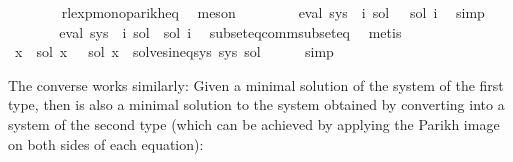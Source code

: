 \begin{isabellebody}
\ \ \ \ \ \ \isamarkupfalse%
\ rlexp{\isacharunderscore}{\kern0pt}mono{\isacharunderscore}{\kern0pt}parikh{\isacharunderscore}{\kern0pt}eq\ \isamarkupfalse%
\ meson\isanewline
\ \ \ \ \isamarkupfalse%
\ \isamarkupfalse%
\ {\isachardoublequoteopen}{\isasymPsi}\ {\isacharparenleft}{\kern0pt}eval\ {\isacharparenleft}{\kern0pt}sys\ {\isacharbang}{\kern0pt}\ i{\isacharparenright}{\kern0pt}\ {\isacharquery}{\kern0pt}sol{\isacharprime}{\kern0pt}{\isacharparenright}{\kern0pt}\ {\isasymsubseteq}\ {\isasymPsi}\ {\isacharparenleft}{\kern0pt}sol\ i{\isacharparenright}{\kern0pt}{\isachardoublequoteclose}\ \isamarkupfalse%
\ simp\isanewline
\ \ \ \ \isamarkupfalse%
\ \isamarkupfalse%
\ {\isachardoublequoteopen}eval\ {\isacharparenleft}{\kern0pt}sys\ {\isacharbang}{\kern0pt}\ i{\isacharparenright}{\kern0pt}\ {\isacharquery}{\kern0pt}sol{\isacharprime}{\kern0pt}\ {\isasymsubseteq}\ {\isacharquery}{\kern0pt}sol{\isacharprime}{\kern0pt}\ i{\isachardoublequoteclose}\ \isamarkupfalse%
\ subseteq{\isacharunderscore}{\kern0pt}comm{\isacharunderscore}{\kern0pt}subseteq\ \isamarkupfalse%
\ metis\isanewline
\ \ \isamarkupfalse%
\isanewline
\ \ \isamarkupfalse%
\ \isamarkupfalse%
\ {\isachardoublequoteopen}{\isacharparenleft}{\kern0pt}{\isasymforall}x{\isachardot}{\kern0pt}\ {\isasymPsi}\ {\isacharparenleft}{\kern0pt}sol\ x{\isacharparenright}{\kern0pt}\ {\isacharequal}{\kern0pt}\ {\isasymPsi}\ {\isacharparenleft}{\kern0pt}{\isacharquery}{\kern0pt}sol{\isacharprime}{\kern0pt}\ x{\isacharparenright}{\kern0pt}{\isacharparenright}{\kern0pt}\ {\isasymand}\ solves{\isacharunderscore}{\kern0pt}ineq{\isacharunderscore}{\kern0pt}sys\ sys\ {\isacharquery}{\kern0pt}sol{\isacharprime}{\kern0pt}{\isachardoublequoteclose}\isanewline
\ \ \ \ \isamarkupfalse%
\ simp\isanewline
{}\isamarkupfalse%
%
\endisatagproof
{\isafoldproof}%
%
\isadelimproof
%
\endisadelimproof
%
\begin{isamarkuptext}%
The converse works similarly: Given a minimal solution  of the system  of the first type,
then  is also a minimal solution to the system obtained by converting  into a system of the second
type (which can be achieved by applying the Parikh image on both sides of each equation):%
\end{isamarkuptext}\isamarkuptrue%

\end{isabellebody}
